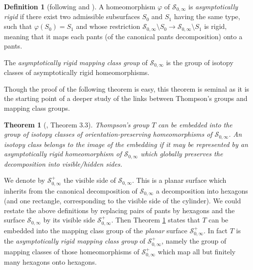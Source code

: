 \documentclass[twoside]{irmaems}
\theoremstyle{plain}
\newtheorem{theorem}{Theorem}[section]
\theoremstyle{definition}
\newtheorem{definition}{Definition}[section]
\theoremstyle{remark}
\begin{document}
\begin{definition}[following  \cite{ka-se} and \cite{fu-ka1}]\label{asy}
A homeomorphism $\varphi$ of $\mathscr{S}_{0,\infty}$ is {\em asymptotically rigid}  if there exist two 
admissible  subsurfaces $S_0$ and $S_1$ having the same type, such that 
$\varphi(S_{0})=S_{1}$ and whose restriction 
$\mathscr{S}_{0,\infty}\setminus{S_0}\rightarrow \mathscr{S}_{0,\infty}\setminus{S_1}$ is rigid, 
meaning that 
it maps each pants (of the canonical pants decomposition) onto a pants. 

\vspace{0.1cm}\noindent 
The {\em asymptotically rigid mapping class group} 
 of $\mathscr{S}_{0,\infty}$ 
is the group of isotopy classes of asymptotically rigid homeomorphisms. 
\end{definition}






\vspace{0.1cm}\noindent 
Though the proof of the following theorem is easy, this theorem is seminal as it is the starting point of a deeper study of the links between Thompson's groups 
and mapping class groups.



\begin{theorem}[\cite{ka-se}, Theorem 3.3]\label{mcg}
Thompson's group  $T$ can be embedded into the group of isotopy classes of orientation-preserving homeomorphisms of
 $\mathscr{S}_{0,\infty}$. An isotopy class belongs to the image of the embedding 
 if it may be represented by 
 an asymptotically rigid homeomorphism of
  $\mathscr{S}_{0,\infty}$ which globally preserves 
  the decomposition into visible/hidden sides.
  \end{theorem}

\vspace{0.1cm}\noindent 
We denote by $\mathscr{S}_{0,\infty}^+$ the visible side of $\mathscr{S}_{0,\infty}$.  This is a planar surface  which inherits from the canonical decomposition of $\mathscr{S}_{0,\infty}$ a decomposition into hexagons (and one rectangle, corresponding to the visible side of the cylinder).
We could restate the above definitions by replacing pairs of pants by hexagons 
and the surface $\mathscr{S}_{0,\infty}$ by its visible side 
$\mathscr{S}_{0,\infty}^+$. 
Then Theorem \ref{mcg} states that $T$ can be embedded into the 
mapping class group of the {\it planar} surface $\mathscr{S}_{0,\infty}^+$.  
In fact $T$ is the {\em asymptotically rigid mapping class group} of 
$\mathscr{S}_{0,\infty}^+$, namely the group of mapping classes of 
those homeomorphisms of $\mathscr{S}_{0,\infty}^+$ 
which map  all but finitely many hexagons onto hexagons.
\end{document}
